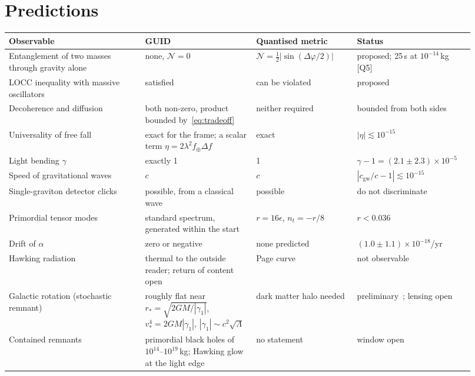 \documentclass[11pt,a4paper]{article}
\theoremstyle{definition}
\theoremstyle{remark}
\newcommand{\chk}[1]{\textsf{[#1]}}
\theoremstyle{definition}
\begin{document}
\section{Predictions}\label{sec:predictions}

\begin{center}\small
\begin{longtable}{@{}p{0.27\linewidth}p{0.22\linewidth}p{0.2\linewidth}p{0.23\linewidth}@{}}
\toprule
Observable & GUID & Quantised metric & Status \\
\midrule
\endhead
Entanglement of two masses through gravity alone~\cite{bose,mv} & none, $\mathcal N=0$ & $\mathcal N=\tfrac12|\sin(\Delta\varphi/2)|$ &
proposed; 25\,s at $10^{-14}$\,kg \chk{Q5} \\
LOCC inequality with massive oscillators~\cite{lpp} & satisfied & can be violated & proposed \\
Decoherence and diffusion~\cite{osswd} & both non-zero, product bounded by~\eqref{eq:tradeoff} & neither required & bounded from both sides \\
Universality of free fall & exact for the frame; a scalar term $\eta=2\lambda^2f_\oplus\Delta f$ & exact & $|\eta|\lesssim10^{-15}$~\cite{microscope} \\
Light bending $\gamma$ & exactly 1 & 1 & $\gamma-1=(2.1\pm2.3)\times10^{-5}$~\cite{cassini} \\
Speed of gravitational waves & $c$ & $c$ & $|c_{\text{gw}}/c-1|\lesssim10^{-15}$~\cite{gw170817} \\
Single-graviton detector clicks~\cite{tobar} & possible, from a classical wave & possible & do not discriminate~\cite{cdr} \\
Primordial tensor modes & standard spectrum, generated within the start & $r=16\epsilon$, $n_t=-r/8$ & $r<0.036$~\cite{bk18} \\
Drift of $\alpha$ & zero or negative & none predicted & $(1.0\pm1.1)\times10^{-18}$/yr~\cite{lange} \\
Hawking radiation & thermal to the outside reader; return of content open & Page curve & not observable \\
Galactic rotation (stochastic remnant) & roughly flat near $r_*=\sqrt{2GM/|\gamma_1|}$, $v_*^4=2GM|\gamma_1|$, $|\gamma_1|\sim c^2\sqrt\Lambda$ &
dark matter halo needed & preliminary~\cite{oppenheimrusso}; lensing open \\
Contained remnants & primordial black holes of $10^{14}$--$10^{19}$\,kg; Hawking glow at the light edge & no statement & window
open~\cite{gortongreen} \\

\end{longtable}
\end{center}
\end{document}
